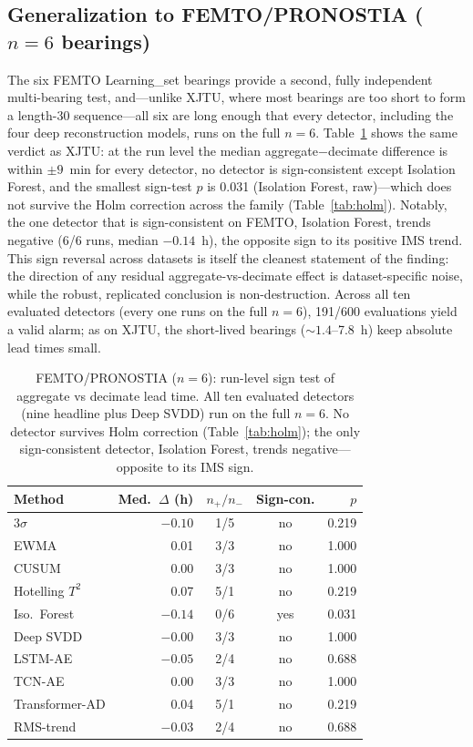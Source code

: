 \documentclass[IJPHM, 2026, 0]{PHMSociety}
\begin{document}
\subsection{Generalization to FEMTO/PRONOSTIA ($n=6$ bearings)}
The six FEMTO Learning\_set bearings provide a second, fully independent multi-bearing test, and---unlike XJTU, where most bearings are too short to form a length-30 sequence---all six are long enough that every detector, including the four deep reconstruction models, runs on the full $n=6$. Table~\ref{tab:femto} shows the same verdict as XJTU: at the run level the median aggregate$-$decimate difference is within $\pm9$~min for every detector, no detector is sign-consistent except Isolation Forest, and the smallest sign-test $p$ is 0.031 (Isolation Forest, raw)---which does not survive the Holm correction across the family (Table~\ref{tab:holm}). Notably, the one detector that is sign-consistent on FEMTO, Isolation Forest, trends negative (6/6 runs, median $-0.14$~h), the opposite sign to its positive IMS trend. This sign reversal across datasets is itself the cleanest statement of the finding: the direction of any residual aggregate-vs-decimate effect is dataset-specific noise, while the robust, replicated conclusion is non-destruction. Across all ten evaluated detectors (every one runs on the full $n=6$), 191/600 evaluations yield a valid alarm; as on XJTU, the short-lived bearings (${\sim}1.4$--7.8~h) keep absolute lead times small.

\begin{table}[t] \small
	\begin{center}
	\caption{FEMTO/PRONOSTIA ($n=6$): run-level sign test of aggregate vs decimate lead time. All ten evaluated detectors (nine headline plus Deep SVDD) run on the full $n=6$. No detector survives Holm correction (Table~\ref{tab:holm}); the only sign-consistent detector, Isolation Forest, trends negative---opposite to its IMS sign.}
	\label{tab:femto}
	\begin{tabular}{l r c c r}
		\hline \hline
		\textbf{Method} & \textbf{Med.\ $\Delta$ (h)} & \textbf{$n_+/n_-$} & \textbf{Sign-con.} & \textbf{$p$} \\
		\hline
		$3\sigma$ & $-0.10$ & 1/5 & no & 0.219 \\
		EWMA & 0.01 & 3/3 & no & 1.000 \\
		CUSUM & 0.00 & 3/3 & no & 1.000 \\
		Hotelling $T^2$ & 0.07 & 5/1 & no & 0.219 \\
		Iso.\ Forest & $-0.14$ & 0/6 & yes & 0.031 \\
		Deep SVDD & $-0.00$ & 3/3 & no & 1.000 \\
		LSTM-AE & $-0.05$ & 2/4 & no & 0.688 \\
		TCN-AE & 0.00 & 3/3 & no & 1.000 \\
		Transformer-AD & 0.04 & 5/1 & no & 0.219 \\
		RMS-trend & $-0.03$ & 2/4 & no & 0.688 \\
		\hline \hline
	\end{tabular}
	\end{center}
\end{table}
\end{document}
